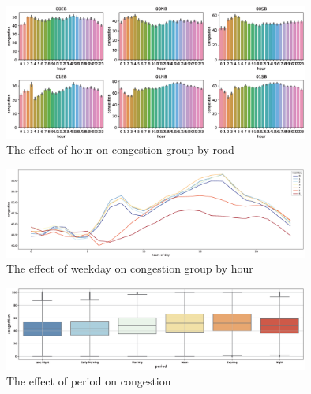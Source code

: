 \begin{figure}
		\setlength{\abovecaptionskip}{0.1cm} 
		\raggedleft
		\includegraphics[width=10.0cm]{figure/road.eps}
		\centering
		\caption{The effect of hour on congestion group by road}
		\label{group by road}
\end{figure}

\begin{figure}
	
		\setlength{\abovecaptionskip}{0.1cm} 
		\raggedleft
		\includegraphics[width=10.0cm]{figure/hour.eps}
		\centering
		\caption{The effect of weekday on congestion group by hour}
		\label{group by hour}
\end{figure}

\begin{center}
	\begin{figure}
			\setlength{\abovecaptionskip}{0.1cm} 
			\raggedleft
			\includegraphics[width=10.0cm]{figure/period.eps}
			\centering
			\caption{The effect of period on congestion}
			\label{period}
	\end{figure}
\end{center}

